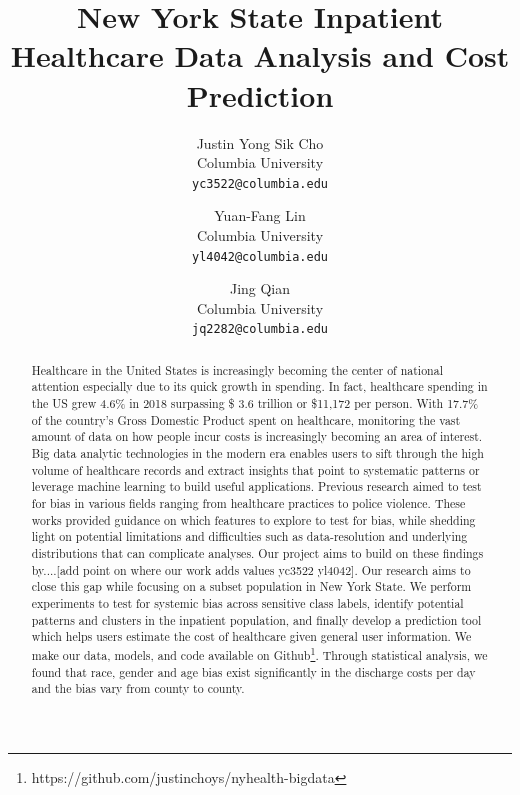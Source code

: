 \documentclass[10pt,twocolumn,letterpaper]{article}
\begin{document}
\title{New York State Inpatient Healthcare Data Analysis and Cost Prediction}

\author{Justin Yong Sik Cho\\
Columbia University\\
{\tt\small yc3522@columbia.edu}
\and
Yuan-Fang Lin\\
Columbia University\\
{\tt\small yl4042@columbia.edu}
\and
Jing Qian\\
Columbia University\\
{\tt\small jq2282@columbia.edu}
}

\maketitle

\begin{abstract}
    Healthcare in the United States is increasingly becoming the center of national attention especially due to its quick growth in spending. In fact, healthcare spending in the US grew 4.6\% in 2018 surpassing \$ 3.6 trillion or \$11,172 per person. With 17.7\% of the country's Gross Domestic Product spent on healthcare, monitoring the vast amount of data on how people incur costs is increasingly becoming an area of interest.
    Big data analytic technologies in the modern era enables users to sift through the high volume of healthcare records and extract insights that point to systematic patterns or leverage machine learning to build useful applications. Previous research aimed to test for bias in various fields ranging from healthcare practices to police violence. These works provided guidance on which features to explore to test for bias, while shedding light on potential limitations and difficulties such as data-resolution and underlying distributions that can complicate analyses. Our project aims to build on these findings by....[add point on where our work adds values yc3522 yl4042]. Our research aims to close this gap while focusing on a subset population in New York State. We perform experiments to test for systemic bias across sensitive class labels, identify potential patterns and clusters in the inpatient population, and finally develop a prediction tool which helps users estimate the cost of healthcare given general user information. We make our data, models, and code available on Github\footnote{https://github.com/justinchoys/nyhealth-bigdata}. Through statistical analysis, we found that race, gender and age bias exist significantly in the discharge costs per day and the bias vary from county to county.%
\end{abstract}
\end{document}
